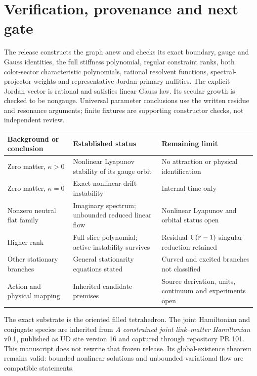 \documentclass[11pt,a4paper]{article}
\begin{document}
\section{Verification, provenance and next gate}
The release constructs the graph anew and checks its exact boundary, gauge and Gauss identities, the full stiffness polynomial, regular constraint ranks, both color-sector characteristic polynomials, rational resolvent functions, spectral-projector weights and representative Jordan-primary nullities. The explicit Jordan vector is rational and satisfies linear Gauss law. Its secular growth is checked to be nongauge. Universal parameter conclusions use the written residue and resonance arguments; finite fixtures are supporting constructor checks, not independent review.

\begin{center}\small
\begin{tabular}{p{39mm}p{44mm}p{51mm}}
\toprule
Background or conclusion & Established status & Remaining limit\\\midrule
Zero matter, $\kappa>0$ & Nonlinear Lyapunov stability of its gauge orbit & No attraction or physical identification\\
Zero matter, $\kappa=0$ & Exact nonlinear drift instability & Internal time only\\
Nonzero neutral flat family & Imaginary spectrum; unbounded reduced linear flow & Nonlinear Lyapunov and orbital status open\\
Higher rank & Full slice polynomial; active instability survives & Residual $\mathrm U(r-1)$ singular reduction retained\\
Other stationary branches & General stationarity equations stated & Curved and excited branches not classified\\
Action and physical mapping & Inherited candidate premises & Source derivation, units, continuum and experiments open\\\bottomrule
\end{tabular}
\end{center}

The exact substrate is the oriented filled tetrahedron. The joint Hamiltonian and conjugate species are inherited from \emph{A constrained joint link--matter Hamiltonian} v0.1, published as UD site version 16 and captured through repository PR 101. This manuscript does not rewrite that frozen release. Its global-existence theorem remains valid: bounded nonlinear solutions and unbounded variational flow are compatible statements.
\end{document}

